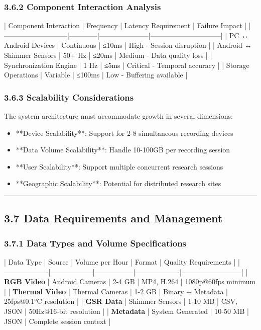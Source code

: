 \documentclass[12pt,a4paper]{article}
\begin{document}
\subsubsection{3.6.2 Component Interaction Analysis}

| Component Interaction     | Frequency  | Latency Requirement | Failure Impact               |
|---------------------------|------------|---------------------|------------------------------|
| PC ↔ Android Devices      | Continuous | ≤10ms               | High - Session disruption    |
| Android ↔ Shimmer Sensors | 50+ Hz     | ≤20ms               | Medium - Data quality loss   |
| Synchronization Engine    | 1 Hz       | ≤5ms                | Critical - Temporal accuracy |
| Storage Operations        | Variable   | ≤100ms              | Low - Buffering available    |

\subsubsection{3.6.3 Scalability Considerations}

The system architecture must accommodate growth in several dimensions:

\begin{itemize}
\item **Device Scalability**: Support for 2-8 simultaneous recording devices
\item **Data Volume Scalability**: Handle 10-100GB per recording session
\item **User Scalability**: Support multiple concurrent research sessions
\item **Geographic Scalability**: Potential for distributed research sites

\end{itemize}
\hrule

\subsection{3.7 Data Requirements and Management}

\subsubsection{3.7.1 Data Types and Volume Specifications}

| Data Type         | Source           | Volume per Hour | Format            | Quality Requirements     |
|-------------------|------------------|-----------------|-------------------|--------------------------|
| \textbf{RGB Video}     | Android Cameras  | 2-4 GB          | MP4, H.264        | 1080p@60fps minimum      |
| \textbf{Thermal Video} | Thermal Cameras  | 1-2 GB          | Binary + Metadata | 25fps@0.1°C resolution   |
| \textbf{GSR Data}      | Shimmer Sensors  | 1-10 MB         | CSV, JSON         | 50Hz@16-bit resolution   |
| \textbf{Metadata}      | System Generated | 10-50 MB        | JSON              | Complete session context |
\end{document}
